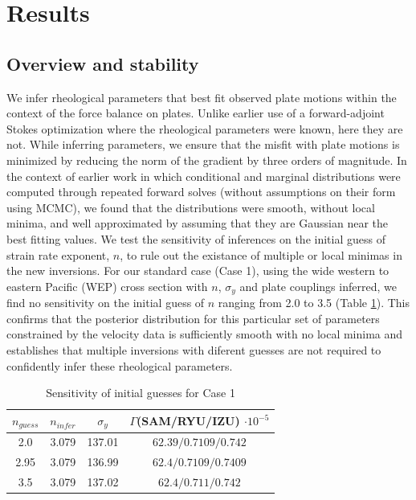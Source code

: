 \documentclass[12pt]{article}
\begin{document}
{\section{Results}

\subsection{Overview and stability}

We infer rheological parameters that best fit observed plate motions
within the context of the force balance on plates. 
Unlike earlier use of a forward-adjoint Stokes optimization \citep{ratnaswamy2015adjoint} where the rheological parameters were known, here they are not. 
While inferring parameters, we ensure that the misfit with plate motions is minimized by reducing the norm of the gradient by three orders of magnitude.
In the context of earlier work \citep{ratnaswamy2015adjoint} in which conditional and marginal distributions were computed through repeated forward solves (without assumptions on their form using MCMC), we found that the distributions were smooth, without local minima, and
well approximated by assuming that they are Gaussian
near the best fitting values.
We test the sensitivity of inferences on the initial guess of strain rate exponent, $n$, to rule out the existance of multiple or local minimas in the new inversions. 
For our standard case (Case 1), using the wide western to eastern Pacific (WEP) cross section with $n$, $\sigma_y$ and plate couplings inferred, we find no sensitivity on the initial guess of $n$ ranging from 2.0 to 3.5 (Table \ref{table:initial_guess}).
This confirms that the posterior distribution for this particular set of
parameters constrained by the velocity data is sufficiently smooth with no local minima
and establishes that multiple inversions with diferent guesses are not required to confidently infer these rheological parameters. 

\begin{table}[H]
		\caption{Sensitivity of initial guesses for Case 1} %
		\centering  %
		\begin{tabular}{ c c c c } %
		\hline \hline                        %
		 $n_{guess}$ &$n_{infer}$ &$\sigma_y$&$\Gamma $(SAM/RYU/IZU) $\cdot 10^{-5}$   \\ [0.5ex] %
		\hline                  %
        	 2.0 &3.079 & 137.01 & $62.39/0.7109/0.742$   \\
	         2.95 &3.079 & 136.99 & $62.4/0.7109/0.7409$    \\
	        3.5 &3.079 & 137.02& $62.4/0.711/0.742$  \\             
                \hline %
		\end{tabular}
		\label{table:initial_guess} %
\end{table}


}
\end{document}
